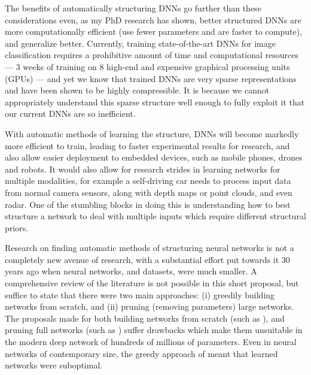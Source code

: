 \documentclass[thesis]{subfiles}
\begin{document}
The benefits of automatically structuring DNNs go further than these considerations even, as my PhD research has shown, better structured DNNs are more computationally efficient (use fewer parameters and are faster to compute), and generalize better. Currently, training state-of-the-art DNNs for image classification requires a prohibitive amount of time and computational resources --- 3 weeks of training on 8 high-end and expensive graphical processing units (GPUs) --- and yet we know that trained DNNs are very sparse representations and have been shown to be highly compressible. It is because we cannot appropriately understand this sparse structure well enough to fully exploit it that our current DNNs are so inefficient.

With automatic methods of learning the structure, DNNs will become markedly more efficient to train, leading to faster experimental results for research, and also allow easier deployment to embedded devices, such as mobile phones, drones and robots. It would also allow for research strides in learning networks for multiple modalities, for example a self-driving car needs to process input data from normal camera sensors, along with depth maps or point clouds, and even radar. One of the stumbling blocks in doing this is understanding how to best structure a network to deal with multiple inputs which require different structural priors.

Research on finding automatic methods of structuring neural networks is not a completely new avenue of research, with a substantial effort put towards it 30 years ago when neural networks, and datasets, were much smaller. A comprehensive review of the literature is not possible in this short proposal, but suffice to state that there were two main approaches: (i) greedily building networks from scratch, and (ii) pruning (removing parameters) large networks. The proposals made for both building networks from scratch (such as \citep{Fahlman1989}), and pruning full networks (such as \citep{lecun1989optimal}) suffer drawbacks which make them unsuitable in the modern deep network of hundreds of millions of parameters. Even in neural networks of contemporary size, the greedy approach of \citet{Fahlman1989} meant that learned networks were suboptimal. %
\end{document}
